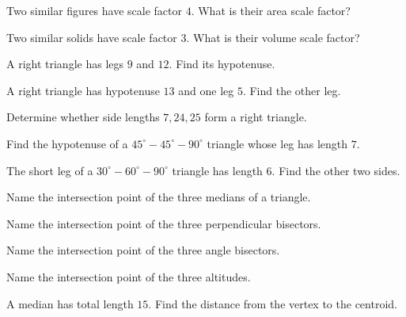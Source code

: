 \begin{exercise}[2]
Two similar figures have scale factor \(4\). What is their area scale
factor?
\end{exercise}

\begin{exercise}[2]
Two similar solids have scale factor \(3\). What is their volume scale
factor?
\end{exercise}

\begin{exercise}[1]
A right triangle has legs \(9\) and \(12\). Find its hypotenuse.
\end{exercise}

\begin{exercise}[1]
A right triangle has hypotenuse \(13\) and one leg \(5\). Find the other
leg.
\end{exercise}

\begin{exercise}[2]
Determine whether side lengths \(7,24,25\) form a right triangle.
\end{exercise}

\begin{exercise}[1]
Find the hypotenuse of a \(45^\circ-45^\circ-90^\circ\) triangle whose leg
has length \(7\).
\end{exercise}

\begin{exercise}[1]
The short leg of a \(30^\circ-60^\circ-90^\circ\) triangle has length \(6\).
Find the other two sides.
\end{exercise}

\begin{exercise}[1]
Name the intersection point of the three medians of a triangle.
\end{exercise}

\begin{exercise}[1]
Name the intersection point of the three perpendicular bisectors.
\end{exercise}

\begin{exercise}[1]
Name the intersection point of the three angle bisectors.
\end{exercise}

\begin{exercise}[1]
Name the intersection point of the three altitudes.
\end{exercise}

\begin{exercise}[2]
A median has total length \(15\). Find the distance from the vertex to the
centroid.
\end{exercise}

